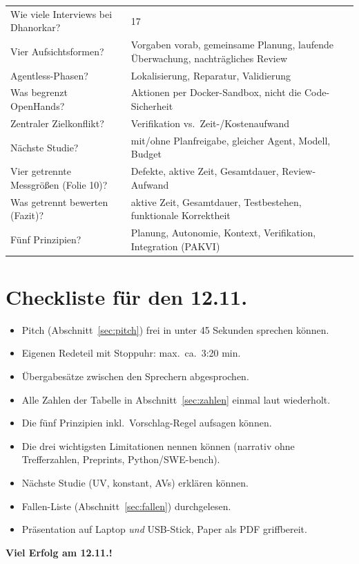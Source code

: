 \documentclass[12pt,a4paper]{article}
\begin{document}
\begin{longtable}{@{}p{8.2cm}p{7.8cm}@{}}
Wie viele Interviews bei Dhanorkar? & 17 \\
Vier Aufsichtsformen? & Vorgaben vorab, gemeinsame Planung, laufende Überwachung, nachträgliches Review \\
Agentless-Phasen? & Lokalisierung, Reparatur, Validierung \\
Was begrenzt OpenHands? & Aktionen per Docker-Sandbox, nicht die Code-Sicherheit \\
Zentraler Zielkonflikt? & Verifikation vs.\ Zeit-/Kostenaufwand \\
Nächste Studie? & mit/ohne Planfreigabe, gleicher Agent, Modell, Budget \\
Vier getrennte Messgrößen (Folie 10)? & Defekte, aktive Zeit, Gesamtdauer, Review-Aufwand \\
Was getrennt bewerten (Fazit)? & aktive Zeit, Gesamtdauer, Testbestehen, funktionale Korrektheit \\
Fünf Prinzipien? & Planung, Autonomie, Kontext, Verifikation, Integration (PAKVI) \\
\bottomrule
\end{longtable}

\section{Checkliste für den 12.11.}
\label{sec:check}

\begin{itemize}[label=$\square$]
  \item Pitch (Abschnitt~\ref{sec:pitch}) frei in unter 45 Sekunden sprechen können.
  \item Eigenen Redeteil mit Stoppuhr: max.\ ca.\ 3:20 min.
  \item Übergabesätze zwischen den Sprechern abgesprochen.
  \item Alle Zahlen der Tabelle in Abschnitt~\ref{sec:zahlen} einmal laut wiederholt.
  \item Die fünf Prinzipien inkl.\ Vorschlag-Regel aufsagen können.
  \item Die drei wichtigsten Limitationen nennen können (narrativ ohne Trefferzahlen, Preprints, Python/SWE-bench).
  \item Nächste Studie (UV, konstant, AVs) erklären können.
  \item Fallen-Liste (Abschnitt~\ref{sec:fallen}) durchgelesen.
  \item Präsentation auf Laptop \emph{und} USB-Stick, Paper als PDF griffbereit.
\end{itemize}

\vspace{1em}
\begin{center}
\color{akzent}\bfseries Viel Erfolg am 12.11.!
\end{center}
\end{document}

